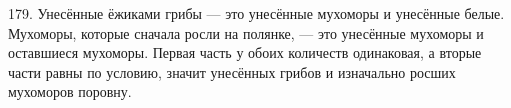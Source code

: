 179. Унесённые ёжиками грибы --- это унесённые мухоморы и унесённые белые. Мухоморы, которые сначала росли на полянке, --- это унесённые мухоморы и оставшиеся мухоморы. Первая часть у обоих количеств одинаковая, а вторые части равны по условию, значит унесённых грибов и изначально росших мухоморов поровну.\\
